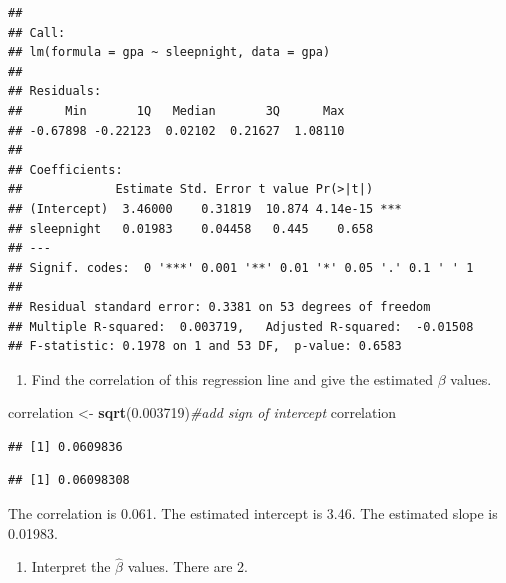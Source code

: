 \documentclass[]{article}
\newenvironment{Shaded}{\begin{snugshade}}{\end{snugshade}}
\newcommand{\CommentTok}[1]{\textcolor[rgb]{0.56,0.35,0.01}{\textit{#1}}}
\newcommand{\FloatTok}[1]{\textcolor[rgb]{0.00,0.00,0.81}{#1}}
\newcommand{\KeywordTok}[1]{\textcolor[rgb]{0.13,0.29,0.53}{\textbf{#1}}}
\newcommand{\NormalTok}[1]{#1}
\newcommand{\OperatorTok}[1]{\textcolor[rgb]{0.81,0.36,0.00}{\textbf{#1}}}
\newcommand{\StringTok}[1]{\textcolor[rgb]{0.31,0.60,0.02}{#1}}
\providecommand{\tightlist}{%
  \setlength{\itemsep}{0pt}\setlength{\parskip}{0pt}}
\begin{document}
\begin{verbatim}
## 
## Call:
## lm(formula = gpa ~ sleepnight, data = gpa)
## 
## Residuals:
##      Min       1Q   Median       3Q      Max 
## -0.67898 -0.22123  0.02102  0.21627  1.08110 
## 
## Coefficients:
##             Estimate Std. Error t value Pr(>|t|)    
## (Intercept)  3.46000    0.31819  10.874 4.14e-15 ***
## sleepnight   0.01983    0.04458   0.445    0.658    
## ---
## Signif. codes:  0 '***' 0.001 '**' 0.01 '*' 0.05 '.' 0.1 ' ' 1
## 
## Residual standard error: 0.3381 on 53 degrees of freedom
## Multiple R-squared:  0.003719,   Adjusted R-squared:  -0.01508 
## F-statistic: 0.1978 on 1 and 53 DF,  p-value: 0.6583
\end{verbatim}

\newpage

\begin{enumerate}
\def\labelenumi{\arabic{enumi}.}
\setcounter{enumi}{3}
\tightlist
\item
  Find the correlation of this regression line and give the estimated
  \(\beta\) values.
\end{enumerate}

\begin{Shaded}
\begin{Highlighting}[]
\NormalTok{correlation <-}\StringTok{ }\KeywordTok{sqrt}\NormalTok{(}\FloatTok{0.003719}\NormalTok{)}\CommentTok{#add sign of intercept}
\NormalTok{correlation}
\end{Highlighting}
\end{Shaded}

\begin{verbatim}
## [1] 0.0609836
\end{verbatim}

\begin{Shaded}
\end{Shaded}

\begin{verbatim}
## [1] 0.06098308
\end{verbatim}

The correlation is 0.061. The estimated intercept is 3.46. The estimated
slope is 0.01983.

\begin{enumerate}
\def\labelenumi{\arabic{enumi}.}
\setcounter{enumi}{4}
\tightlist
\item
  Interpret the \(\hat{\beta}\) values. There are 2.
\end{enumerate}
\end{document}
